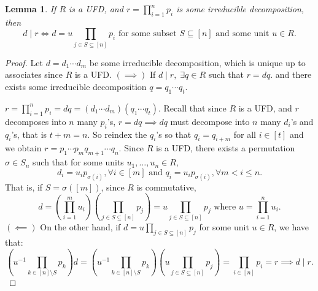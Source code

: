 \documentclass[addpoints,10pt]{exam}
\theoremstyle{plain}
\theoremstyle{definition}
\theoremstyle{plain}
\theoremstyle{plain}
\newtheorem{lem}[thm]{Lemma}
\theoremstyle{definition}
\begin{document}
\setcounter{thm}{0} %
\begin{lem}\label{lem:UFDiv}
    If $R$ is a UFD, and $r=\prod_{i=1}^{n}p_{i}$ is some irreducible decomposition, then
    $$d\mid r \iff d=u\prod_{j\in S\subseteq [n]}p_{i}\text{ for some subset }S\subseteq [n]\text{ and some unit }u\in R.$$
\end{lem}

\begin{proof}
    Let $d=d_{1}\cdots d_{m}$ be some irreducible decomposition, which is unique up to associates since $R$ is a UFD. $(\implies)$ If $d\mid r,\;\exists q\in R$ such that $r=dq.$ and there exists some irreducible decomposition $q=q_{1}\cdots q_{t}.$
    
    $r=\prod_{i=1}^{n}p_{i}=dq=(d_{1}\cdots d_{m})(q_{1}\cdots q_{t}).$ Recall that since $R$ is a UFD, and $r$ decomposes into $n$ many $p_{i}$'s, $r=dq\implies dq$ must decompose into $n$ many $d_{i}$'s and $q_{i}$'s, that is $t+m=n.$ So reindex the $q_{i}$'s so that $q_{i}=q_{i+m}$ for all $i\in [t]$ and we obtain $r=p_{1}\cdots p_{m}q_{m+1}\cdots q_{n}.$ Since $R$ is a UFD, there exists a permutation $\sigma\in S_{n}$ such that for some units $u_{1},\hdots, u_{n}\in R$,
    $$d_{i}=u_{i}p_{\sigma(i)},\forall i\in [m]\text{ and }q_{i}=u_{i}p_{\sigma(i)},\forall m<i\leq n.$$
    That is, if $S=\sigma([m])$, since $R$ is commutative, 
    $$d=(\prod_{i=1}^{m}u_{i})(\prod_{j\in S\subseteq [n]}p_{j})=u\prod_{j\in S\subseteq [n]}p_{j}\text{ where }u=\prod_{i=1}^{n}u_{i}.$$
    $(\impliedby)$ On the other hand, if $d=u\prod_{j\in S\subseteq [n]}p_{j}$ for some unit $u\in R$, we have that: 
    $$(u^{-1}\prod_{k\in [n]\setminus S} p_{k})d=(u^{-1}\prod_{k\in [n]\setminus S} p_{k})(u\prod_{j\in S\subseteq [n]}p_{j})=\prod_{i\in [n]}p_{i}=r\implies d\mid r.$$
    
\end{proof}
\end{document}
